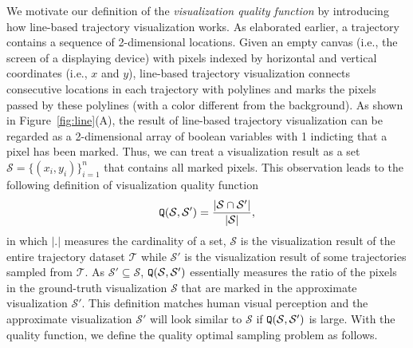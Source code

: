 We motivate our definition of the \textit{visualization quality function} by introducing how line-based trajectory visualization works.
As elaborated earlier, a trajectory contains a sequence of 2-dimensional locations.
Given an empty canvas (i.e., the screen of a displaying device) with pixels indexed by horizontal and vertical coordinates (i.e., $x$ and $y$), line-based trajectory visualization connects consecutive locations in each trajectory with polylines and marks the pixels passed by these polylines (with a color different from the background).
As shown in Figure~\ref{fig:line}(A), the result of line-based trajectory visualization can be regarded as a 2-dimensional array of boolean variables with 1 indicting that a pixel has been marked.
Thus, we can treat a visualization result as a set $\mathcal{S}=\{(x_i, y_i)\}_{i=1}^{n}$ that contains all marked pixels.
This observation leads to the following definition of visualization quality function
\begin{equation}\label{eqref:loss}
\mathtt{Q}(\mathcal{S}, \mathcal{S}')=\frac{|\mathcal{S} \cap \mathcal{S}'|}{|\mathcal{S}|},
\end{equation}
in which $|.|$ measures the cardinality of a set, $\mathcal{S}$ is the visualization result of the entire trajectory dataset $\mathcal{T}$ while $ \mathcal{S}'$ is the visualization result of some trajectories sampled from $\mathcal{T}$.
As $\mathcal{S}'\subseteq \mathcal{S}$, $\mathtt{Q}(\mathcal{S}, \mathcal{S}')$ essentially measures the ratio of the pixels in the ground-truth visualization $\mathcal{S}$ that are marked in the approximate visualization $\mathcal{S}'$.
This definition matches human visual perception and the approximate visualization $\mathcal{S}'$ will look similar to $\mathcal{S}$ if $\mathtt{Q}(\mathcal{S}, \mathcal{S}')$ is large.
With the quality function, we define the quality optimal sampling problem as follows.

